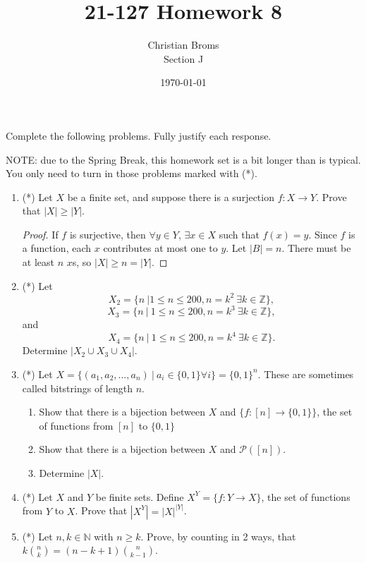 \documentclass[12pt]{article}
\newcommand{\Z}{\mathbb{Z}}
\newcommand{\N}{\mathbb{N}}
\begin{document}
\title{21-127 Homework 8
}
\author{Christian Broms \\ Section J}
\date{\today}
\maketitle

Complete the following problems. Fully justify each response.

NOTE: due to the Spring Break, this homework set is a bit longer than is typical. You only need to turn in those problems marked with (*).

\begin{enumerate}


\item (*) Let $X$ be a finite set, and suppose there is a surjection $f:X\to Y$. Prove that $|X|\geq |Y|$. 
\begin{proof}
If $f$ is surjective, then $\forall y \in Y$, $\exists x \in X$ such that $f(x) = y$. Since $f$ is a function, each $x$ contributes at most one to $y$. Let $|B| = n$. There must be at least $n$ $x$s, so $|X| \geq n = |Y|$.
\end{proof}

\item (*) Let \[X_2=\{n\ | 1\leq n\leq 200, n=k^2\ \exists k\in \Z\},\] \[X_3=\{n\ | \ 1\leq n\leq 200, n=k^3\ \exists k\in \Z\},\] and \[X_4 = \{n\ | \ 1\leq n\leq 200, n=k^4\ \exists k\in \Z\}.\] Determine $|X_2\cup X_3\cup X_4|$.

\item (*) Let $X=\{ (a_1, a_2, \dots, a_n)\ | \ a_i\in\{0,1\}\forall i\} = \{0,1\}^n$. These are sometimes called bitstrings of length $n$.
\begin{enumerate}
\item Show that there is a bijection between $X$ and $\{f:[n]\to\{0,1\}\}$, the set of functions from $[n]$ to $\{0,1\}$
\item Show that there is a bijection between $X$ and $\mathcal{P}([n])$.
\item Determine $|X|$.
\end{enumerate}

\item (*) Let $X$ and $Y$ be finite sets. Define $X^Y = \{f:Y\to X\}$, the set of functions from $Y$ to $X$. Prove that $|X^Y|=|X|^{|Y|}$.

\item (*) Let $n, k\in \N$ with $n\geq k$. Prove, by counting in 2 ways, that $k{n\choose k} = (n-k+1){n\choose k-1}$.


\end{enumerate}
\end{document}
